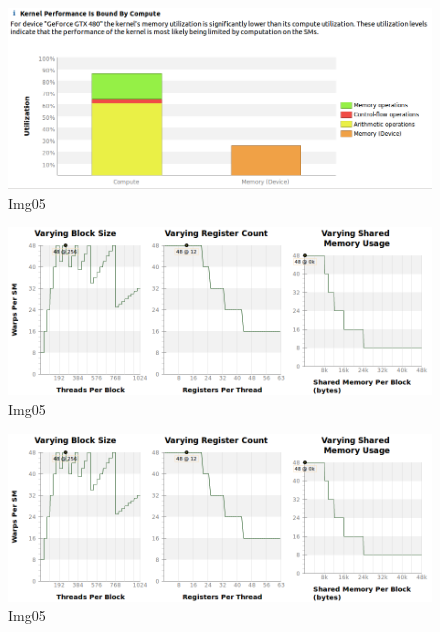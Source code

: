 \documentclass[a4paper]{article}
\begin{document}
\begin{figure}[ht]
    \centering
    \includegraphics[width=0.7\linewidth]{profiling/darker/darker_utilization_00}
    \caption{Img05}
    \label{fig:du}
\end{figure}
\FloatBarrier

\begin{figure}[ht]
    \centering
    \includegraphics[width=0.7\linewidth]{profiling/darker/darker_varying}
    \caption{Img05}
    \label{fig:dv}
\end{figure}
\FloatBarrier



\begin{figure}[ht]
    \centering
    \includegraphics[width=0.7\linewidth]{profiling/darker/darker_varying}
    \caption{Img05}
    \label{fig:img05Prof}
\end{figure}
\FloatBarrier

\printbibliography 
\end{document}
